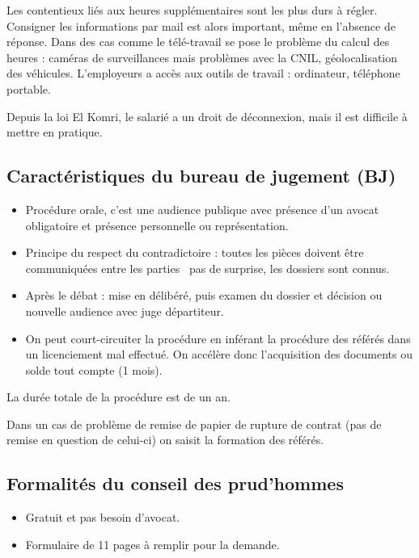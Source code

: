 	Les contentieux liés aux heures supplémentaires sont les plus durs à régler.
	Consigner les informations par mail est alors important, même en l'absence de réponse.
	Dans des cas comme le télé-travail se pose le problème du calcul des heures : caméras de surveillances mais problèmes avec la CNIL, géolocalisation des véhicules.
	L'employeurs a accès aux outils de travail : ordinateur, téléphone portable.
	
	Depuis la loi El Komri, le salarié a un droit de déconnexion, mais il est difficile à mettre en pratique.


\subsection{Caractéristiques du bureau de jugement (BJ)}

	\begin{itemize}
		\item[\textbullet] Procédure orale, c'est une audience publique avec présence d'un avocat obligatoire et présence personnelle ou représentation.
		\item[\textbullet] Principe du respect du contradictoire : toutes les pièces doivent être communiquées entre les parties \textrightarrow\ pas de surprise, les dossiers sont connus.
		\item[\textbullet] Après le débat : mise en délibéré, puis examen du dossier et décision ou nouvelle audience avec juge départiteur.
		\item[\textbullet] On peut court-circuiter la procédure en inférant la procédure des référés dans un licenciement mal effectué. On accélère donc l’acquisition des documents ou solde tout compte (1 mois).
	\end{itemize}

	La durée totale de la procédure est de un an.
	
	Dans un cas de problème de remise de papier de rupture de contrat (pas de remise en question de celui-ci) on saisit la formation des référés.


\subsection{Formalités du conseil des prud'hommes}

	\begin{itemize}
		\item[\textbullet] Gratuit et pas besoin d’avocat.
		\item[\textbullet] Formulaire de 11 pages à remplir pour la demande.
	\end{itemize}
	
